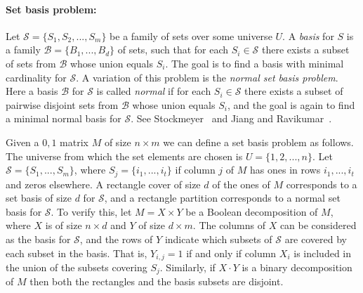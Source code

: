 \documentclass[11pt]{article}
\renewcommand{\kbldelim}{\left(}
\renewcommand{\kbrdelim}{\right)}
\renewcommand{\kbldelim}{\left(}
\renewcommand{\kbrdelim}{\right)}
\begin{document}
\vspace{-0.5 cm}
\paragraph{Set basis problem:}  Let $\mathcal{S} = \{S_1,S_2,...,S_m\}$ be a family of sets over some universe $U$.
A {\em basis} for $S$ is a family $\mathcal{B} = \{B_1,...,B_d\}$ of sets, such that for each $S_i \in \mathcal{S}$ there exists a subset of sets from $\mathcal{B}$ whose union equals $S_i$.
The goal is to find a basis with minimal cardinality for $\mathcal{S}$. A variation of this problem is the {\em normal set basis problem}.
Here a basis $\mathcal{B}$ for $\mathcal{S}$ is called {\em normal} if for each $S_i \in \mathcal{S}$ there exists a subset of pairwise disjoint sets from $\mathcal{B}$ whose union equals $S_i$,
and the goal is again to find a minimal normal basis for $\mathcal{S}$. See Stockmeyer~\cite{stockmeyer1975set} and Jiang and Ravikumar~\cite{jiang1993minimal}.

Given a $0,1$ matrix $M$ of size $n \times m$ we can define a set basis problem as follows. The universe from which the set elements are chosen is $U = \{1,2,...,n\}$.
Let $\mathcal{S} = \{S_1,...,S_m\}$, where $S_j = \{i_1,...,i_t\}$ if column $j$ of $M$ has ones in rows $i_1,...,i_t$ and zeros elsewhere.
A rectangle cover of size $d$ of the ones of $M$ corresponds to a set basis of size $d$ for $\mathcal{S}$, and a rectangle partition corresponds to a normal set basis for $\mathcal{S}$.
To verify this, let $M = X \times Y$ be a Boolean decomposition of $M$, where $X$ is of size $n \times d$ and $Y$ of size $d \times m$.
The columns of $X$ can be considered as the basis for $\mathcal{S}$, and the rows of $Y$ indicate which subsets of $\mathcal{S}$ are covered by each subset in the basis. That is,
 $Y_{i,j} = 1$ if and only if column $X_i$ is included in the union of the subsets covering $S_j$.
Similarly, if $X\cdot Y$ is a binary decomposition of $M$ then  both the rectangles and the basis subsets are disjoint.

\renewcommand{\kbldelim}{(}%
\renewcommand{\kbrdelim}{)}%
\end{document}
